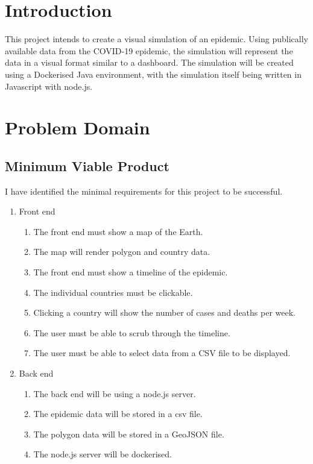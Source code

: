 \documentclass{report}
\begin{document}
\chapter{Introduction}
This project intends to create a visual simulation of an epidemic. Using publically available data from the COVID-19 epidemic, the simulation will represent the data in a visual format similar to a dashboard. The simulation will be created using a Dockerised Java environment, with the simulation itself being written in Javascript with node.js.

\newpage

\chapter{Problem Domain}
\section{Minimum Viable Product}
I have identified the minimal requirements for this project to be successful.
\begin{enumerate}
    \item Front end
    \begin{enumerate}
        \item The front end must show a map of the Earth.
        \item The map will render polygon and country data.
        \item The front end must show a timeline of the epidemic.
        \item The individual countries must be clickable.
        \item Clicking a country will show the number of cases and deaths per week.
        \item The user must be able to scrub through the timeline.
        \item The user must be able to select data from a CSV file to be displayed.
    \end{enumerate}
    \item Back end
    \begin{enumerate}
        \item The back end will be using a node.js server.
        \item The epidemic data will be stored in a csv file.
        \item The polygon data will be stored in a GeoJSON file.
        \item The node.js server will be dockerised.
    \end{enumerate}
\end{enumerate}
\newpage
\end{document}
